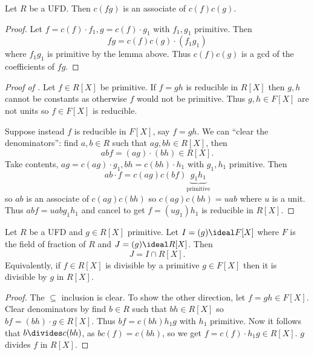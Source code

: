 \documentclass[a4paper]{article}
\theoremstyle{definition}
\begin{document}
\begin{corollary}
  Let \(R\) be a UFD. Then \(c(fg)\) is an associate of \(c(f)c(g)\).
\end{corollary}

\begin{proof}
  Let \(f = c(f) \cdot f_1, g = c(f) \cdot g_1\) with \(f_1, g_1\) primitive. Then
  \[
    fg = c(f)c(g) \cdot (f_1g_1)
  \]
  where \(f_1g_1\) is primitive by the lemma above. Thus \(c(f)c(g)\) is a gcd of the coefficients of \(fg\).
\end{proof}

\begin{proof}[Proof of ]
  Let \(f \in R[X]\) be primitive. If \(f = gh\) is reducible in \(R[X]\) then \(g, h\) cannot be constants as otherwise \(f\) would not be primitive. Thus \(g, h \in F[X]\) are not units so \(f \in F[X]\) is reducible.

  Suppose instead \(f\) is reducible in \(F[X]\), say \(f = gh\). We can ``clear the denominators'': find \(a, b \in R\) such that \(ag, bh \in R[X]\), then
  \[
    abf = (ag) \cdot (bh) \in R[X].
  \]
  Take contents, \(ag = c(ag) \cdot g_1, bh = c(bh) \cdot h_1\) with \(g_1, h_1\) primitive. Then
  \[
    ab \cdot f = c(ag)c(bf) \underbrace{g_1h_1}_{\text{primitive}}
  \]
  so \(ab\) is an associate of \(c(ag)c(bh)\) so \(c(ag)c(bh) = uab\) where \(u\) is a unit. Thus \(abf = uabg_1h_1\) and cancel to get \(f = (ug_1)h_1\) is reducible in \(R[X]\).
\end{proof}

\begin{proposition}
  Let \(R\) be a UFD and \(g \in R[X]\) primitive. Let \(I = (g) \ideal F[X]\) where \(F\) is the field of fraction of \(R\) and \(J = (g) \ideal R[X]\). Then
  \[
    J = I \cap R[X].
  \]
  Equivalently, if \(f \in R[X]\) is divisible by a primitive \(g \in F[X]\) then it is divisible by \(g\) in \(R[X]\).
\end{proposition}

\begin{proof}
  The \(\subseteq\) inclusion is clear. To show the other direction, let \(f = gh \in F[X]\). Clear denominators by find \(b \in R\) such that \(bh \in R[X]\) so \(bf = (bh) \cdot g \in R[X]\). Thus \(bf = c(bh)h_1g\) with \(h_1\) primitive. Now it follows that \(b \divides c(bh)\), as \(bc(f) = c(bh)\), so we get \(f = c(f) \cdot h_1g \in R[X]\). \(g\) divides \(f\) in \(R[X]\).
\end{proof}
\end{document}
